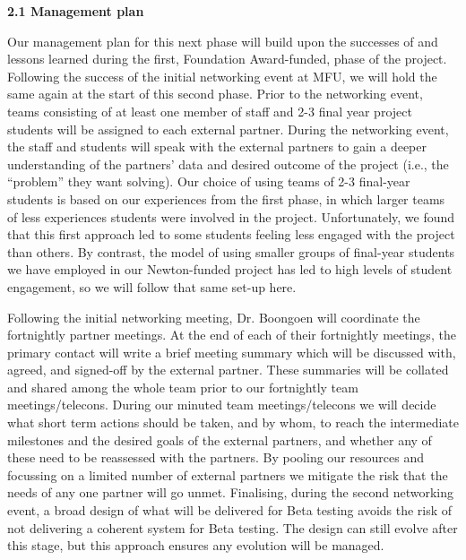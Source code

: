 \documentclass[11pt]{article}
\begin{document}
  \pagebreak

  \vspace{3mm}
  \noindent
  {\large \bf 2.1 Management plan}
    
  \noindent
  Our management plan for this next phase will build upon the successes of and lessons learned during the first, Foundation Award-funded, phase of the project. Following the success of the initial networking event at MFU, we will hold the same again at the start of this second phase. Prior to the networking event, teams consisting of at least one member of staff and 2-3 final year project students will be assigned to each external partner. During the networking event, the staff and students will speak with the external partners to gain a deeper understanding of the partners' data and desired outcome of the project (i.e., the ``problem'' they want solving). Our choice of using teams of 2-3 final-year students is based on our experiences from the first phase, in which larger teams of less experiences students were involved in the project. Unfortunately, we found that this first approach led to some students feeling less engaged with the project than others. By contrast, the model of using smaller groups of final-year students we have employed in our Newton-funded project has led to high levels of student engagement, so we will follow that same set-up here.
  
  \vspace{2mm}
  \noindent
  Following the initial networking meeting, Dr. Boongoen will coordinate the fortnightly partner meetings. At the end of each of their fortnightly meetings, the primary contact will write a brief meeting summary which will be discussed with, agreed, and signed-off by the external partner. These summaries will be collated and shared among the whole team prior to our fortnightly team meetings/telecons. During our minuted team meetings/telecons we will decide what short term actions should be taken, and by whom, to reach the intermediate milestones and the desired goals of the external partners, and whether any of these need to be reassessed with the partners. By pooling our resources and focussing on a limited number of external partners we mitigate the risk that the needs of any one partner will go unmet. Finalising, during the second networking event, a broad design of what will be delivered for Beta testing avoids the risk of not delivering a coherent system for Beta testing. The design can still evolve after this stage, but this approach ensures any evolution will be managed. 
  
\end{document}
